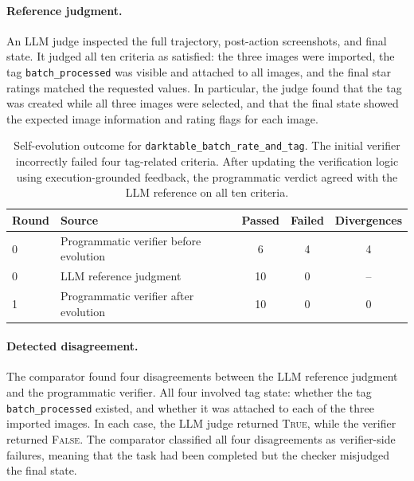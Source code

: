\documentclass{llmxive}
\begin{document}
\paragraph{Reference judgment.}
An LLM judge inspected the full trajectory, post-action screenshots, and final
state. It judged all ten criteria as satisfied: the three images were imported,
the tag \texttt{batch\_processed} was visible and attached to all images, and the
final star ratings matched the requested values. In particular, the judge found
that the tag was created while all three images were selected, and that the final
state showed the expected image information and rating flags for each image.

\begin{table}[!htbp]
\centering
\small
\begin{tabular}{llccc}
\toprule
Round & Source & Passed & Failed & Divergences \\
\midrule
0 & Programmatic verifier before evolution & 6 & 4 & 4 \\
0 & LLM reference judgment & 10 & 0 & -- \\
1 & Programmatic verifier after evolution & 10 & 0 & 0 \\
\bottomrule
\end{tabular}
\caption{
Self-evolution outcome for \texttt{darktable\_batch\_rate\_and\_tag}. The initial
verifier incorrectly failed four tag-related criteria. After updating the
verification logic using execution-grounded feedback, the programmatic verdict
agreed with the LLM reference on all ten criteria.
}
\label{tab:darktable-self-evolving-outcome}
\end{table}

\paragraph{Detected disagreement.}
The comparator found four disagreements between the LLM reference judgment and
the programmatic verifier. All four involved tag state: whether the tag
\texttt{batch\_processed} existed, and whether it was attached to each of the
three imported images. In each case, the LLM judge returned \textsc{True}, while
the verifier returned \textsc{False}. The comparator classified all four
disagreements as verifier-side failures, meaning that the task had been completed
but the checker misjudged the final state.
\end{document}
